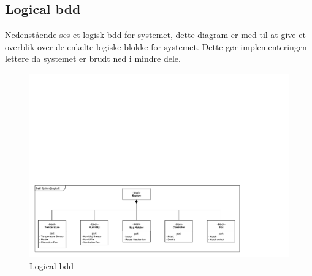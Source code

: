 
\subsection{Logical bdd}

Nedenstående ses et logisk bdd for systemet, dette diagram er med til at give et overblik over de enkelte logiske blokke for systemet. Dette gør implementeringen lettere da systemet er brudt ned i mindre dele.

\begin{figure}[H]
\centering
\includegraphics[page=1,width=\linewidth,viewport=08mm 8mm 238mm 80mm]{./2_systemarkitektur/diagrammer/SYSML_Diagrammer_v4.pdf}
\caption[Diagram]{Logical bdd}
\label{fig:SystemStateDiagram}
\end{figure}

\clearpage